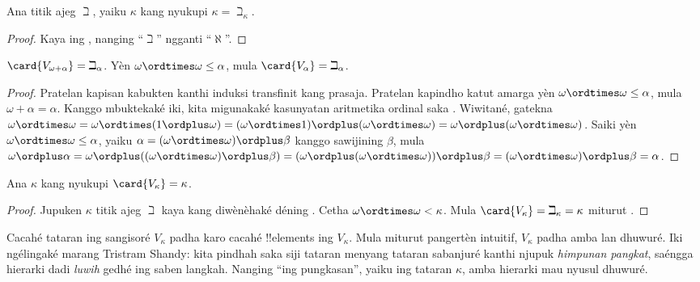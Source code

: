\documentclass[../../../include/open-logic-section]{subfiles}
\begin{document}
\begin{prop}
Ana titik ajeg $\beth$, yaiku $\kappa$ kang nyukupi $\kappa=
\beth_\kappa$.
\end{prop}

\begin{proof}
Kaya ing , nanging ``$\beth$'' ngganti ``$\aleph$''.
\end{proof}

\begin{prop}
$\card{V_{\omega+\alpha}} = \beth_{\alpha}$. Yèn $\omega \ordtimes
\omega \leq \alpha$, mula $\card{V_\alpha} = \beth_\alpha$.
\end{prop}

\begin{proof}
Pratelan kapisan kabukten kanthi induksi transfinit kang prasaja.
Pratelan kapindho katut amarga yèn $\omega \ordtimes \omega \leq \alpha$,
mula $\omega + \alpha = \alpha$. Kanggo mbuktekaké iki, kita migunakaké
kasunyatan aritmetika ordinal saka .
Wiwitané, gatekna $\omega \ordtimes \omega = \omega \ordtimes (1 \ordplus \omega) =
(\omega  \ordtimes 1) \ordplus (\omega\ordtimes\omega) = \omega
\ordplus (\omega \ordtimes \omega)$. Saiki yèn $\omega \ordtimes \omega
\leq \alpha$, yaiku $\alpha = (\omega\ordtimes\omega) \ordplus \beta$
kanggo sawijining $\beta$, mula $\omega \ordplus \alpha = \omega \ordplus
((\omega \ordtimes \omega) \ordplus \beta) = (\omega \ordplus (\omega
\ordtimes \omega)) \ordplus \beta = (\omega \ordtimes \omega) \ordplus
\beta = \alpha$.
\end{proof}

\begin{cor}
Ana $\kappa$ kang nyukupi $\card{V_\kappa} = \kappa$.
\end{cor}

\begin{proof}
Jupuken $\kappa$ titik ajeg $\beth$ kaya kang diwènèhaké déning
. Cetha $\omega \ordtimes \omega < \kappa$.
Mula $\card{V_\kappa} = \beth_\kappa= \kappa$ miturut
.
\end{proof}

Cacahé tataran ing sangisoré $V_\kappa$ padha karo cacahé !!{element}s
ing $V_\kappa$. Mula miturut pangertèn intuitif, $V_\kappa$ padha
amba lan dhuwuré. Iki ngélingaké marang Tristram Shandy: kita pindhah
saka siji tataran menyang tataran sabanjuré kanthi njupuk
\emph{himpunan pangkat}, saéngga hierarki dadi \emph{luwih}
gedhé ing saben langkah. Nanging ``ing pungkasan'', yaiku ing tataran
$\kappa$, amba hierarki mau nyusul dhuwuré.
\end{document}
